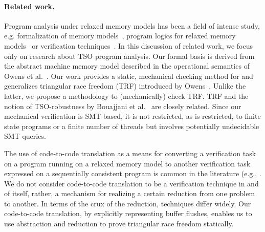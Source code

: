 \documentclass[preprint,9pt]{sigplanconf}
\begin{document}
\paragraph{Related work.}
Program analysis under relaxed memory models has been a field of intense study, e.g. formalization of memory models~\cite{BA2008,BOS2011,HMS+2012,SSO+2010}, program logics for relaxed memory models~\cite{BDG2013,FFS2010,Rid2010,VN2013} or verification techniques~\cite{AKN+2013,BDM2013,BM2008,DMV+2013,ND2013}. 
In this discussion of related work, we focus only on research about TSO program analysis. %
Our formal basis is derived from the abstract machine memory model described in the operational semantics of Owens et al.~\cite{OSS2009}. 
Our work provides a static, mechanical checking method for and generalizes triangular race freedom (TRF) introduced by Owens~\cite{Owe2010}. 
Unlike the latter, we propose a methodology to (mechanically) check TRF.
TRF and the notion of TSO-robustness by Bouajjani et al.~\cite{BDM2013} are closely related. 
Since our mechanical verification is SMT-based, it is not restricted, as is \cite{BDM2013} restricted, to finite state programs or a finite number of threads but involves potentially undecidable SMT queries. 

The use of code-to-code translation as a means for converting a verification task on a program running on a relaxed memory model to another verification task expressed on a sequentially consistent program is common in the literature (e.g., \cite{FBP2011,BDM2013,DMV+2013,AKN+2013}. 
We do not consider code-to-code translation to be a verification technique in and of itself, rather, a mechanism for realizing a certain reduction from one problem to another. 
In terms of the crux of the reduction, techniques differ widely. 
Our code-to-code translation, by explicitly representing buffer flushes, enables us to use abstraction and reduction to prove triangular race freedom statically. 
\end{document}
